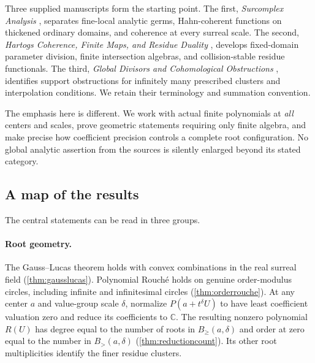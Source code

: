 \documentclass[11pt,letterpaper]{article}
\numberwithin{equation}{section}
\theoremstyle{definition}
\theoremstyle{remark}
\newcommand{\C}{\mathbb C}
\newcommand{\Bge}[2]{B_{\ge}(#1,#2)}
\newcommand{\Bgt}[2]{B_{>}(#1,#2)}
\begin{document}
Three supplied manuscripts form the starting point. The first,
\emph{Surcomplex Analysis} \cite{SourceAnalysis}, separates fine-local
analytic germs, Hahn-coherent functions on thickened ordinary domains,
and coherence at every surreal scale. The second, \emph{Hartogs Coherence,
Finite Maps, and Residue Duality} \cite{SourceResearch}, develops
fixed-domain parameter division, finite intersection algebras, and
collision-stable residue functionals. The third, \emph{Global Divisors and
Cohomological Obstructions} \cite{SourceGlobal}, identifies support
obstructions for infinitely many prescribed clusters and interpolation
conditions. We retain their terminology and summation convention.

The emphasis here is different. We work with actual finite polynomials at
\emph{all} centers and scales, prove geometric statements requiring only
finite algebra, and make precise how coefficient precision controls a
complete root configuration. No global analytic assertion from the sources
is silently enlarged beyond its stated category.

\subsection{A map of the results}
The central statements can be read in three groups.

\paragraph{Root geometry.}
The Gauss--Lucas theorem holds with convex combinations in the real surreal
field (\cref{thm:gausslucas}). Polynomial Rouch\'e holds on genuine
order-modulus circles, including infinite and infinitesimal circles
(\cref{thm:orderrouche}). At any center $a$ and value-group scale $\delta$,
normalize $P(a+t^\delta U)$ to have least coefficient valuation zero and
reduce its coefficients to $\C$. The resulting nonzero polynomial $R(U)$
has degree equal to the number of roots in $\Bge{a}{\delta}$ and order at
zero equal to the number in $\Bgt{a}{\delta}$
(\cref{thm:reductioncount}). Its other root multiplicities identify the
finer residue clusters.
\end{document}
